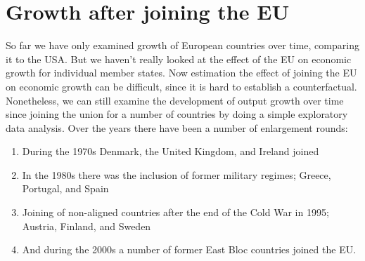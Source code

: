 \documentclass{tufte-handout}
\begin{document}
\section{Growth after joining the EU}
So far we have only examined growth of European countries over time, comparing it to the USA. 
But we haven't really looked at the effect of the EU on economic growth for individual member states. 
Now estimation the effect of joining the EU on economic growth can be difficult, since it is hard to establish a counterfactual. 
Nonetheless, we can still examine the development of output growth over time since joining the union for a number of countries by doing a simple exploratory data analysis. 
Over the years there have been a number of enlargement rounds:
\begin{enumerate}
  \item During the 1970s Denmark, the United Kingdom, and Ireland joined
  \item In the 1980s there was the inclusion of former military regimes; Greece, Portugal, and Spain
  \item Joining of non-aligned countries after the end of the Cold War in 1995; Austria, Finland, and Sweden
  \item And during the 2000s a number of former East Bloc countries joined the EU. 
\end{enumerate} 
\end{document}
